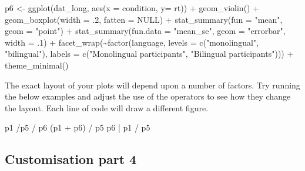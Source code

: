 \documentclass[
  english,
  doc,floatsintext]{apa6}
\newenvironment{Shaded}{\begin{snugshade}}{\end{snugshade}}
\newcommand{\AttributeTok}[1]{\textcolor[rgb]{0.77,0.63,0.00}{#1}}
\newcommand{\ConstantTok}[1]{\textcolor[rgb]{0.00,0.00,0.00}{#1}}
\newcommand{\DecValTok}[1]{\textcolor[rgb]{0.00,0.00,0.81}{#1}}
\newcommand{\FunctionTok}[1]{\textcolor[rgb]{0.00,0.00,0.00}{#1}}
\newcommand{\NormalTok}[1]{#1}
\newcommand{\OtherTok}[1]{\textcolor[rgb]{0.56,0.35,0.01}{#1}}
\newcommand{\SpecialCharTok}[1]{\textcolor[rgb]{0.00,0.00,0.00}{#1}}
\newcommand{\StringTok}[1]{\textcolor[rgb]{0.31,0.60,0.02}{#1}}
\begin{document}
\begin{Shaded}
\begin{Highlighting}[]
\NormalTok{p6 }\OtherTok{\textless{}{-}} \FunctionTok{ggplot}\NormalTok{(dat\_long, }\FunctionTok{aes}\NormalTok{(}\AttributeTok{x =}\NormalTok{ condition, }\AttributeTok{y=}\NormalTok{ rt)) }\SpecialCharTok{+}
  \FunctionTok{geom\_violin}\NormalTok{() }\SpecialCharTok{+}
  \FunctionTok{geom\_boxplot}\NormalTok{(}\AttributeTok{width =}\NormalTok{ .}\DecValTok{2}\NormalTok{, }\AttributeTok{fatten =} \ConstantTok{NULL}\NormalTok{) }\SpecialCharTok{+}
  \FunctionTok{stat\_summary}\NormalTok{(}\AttributeTok{fun =} \StringTok{"mean"}\NormalTok{, }\AttributeTok{geom =} \StringTok{"point"}\NormalTok{) }\SpecialCharTok{+}
  \FunctionTok{stat\_summary}\NormalTok{(}\AttributeTok{fun.data =} \StringTok{"mean\_se"}\NormalTok{, }\AttributeTok{geom =} \StringTok{"errorbar"}\NormalTok{, }\AttributeTok{width =}\NormalTok{ .}\DecValTok{1}\NormalTok{) }\SpecialCharTok{+}
  \FunctionTok{facet\_wrap}\NormalTok{(}\SpecialCharTok{\textasciitilde{}}\FunctionTok{factor}\NormalTok{(language, }
                     \AttributeTok{levels =} \FunctionTok{c}\NormalTok{(}\StringTok{"monolingual"}\NormalTok{, }\StringTok{"bilingual"}\NormalTok{),}
                     \AttributeTok{labels =} \FunctionTok{c}\NormalTok{(}\StringTok{"Monolingual participants"}\NormalTok{, }
                                \StringTok{"Bilingual participants"}\NormalTok{))) }\SpecialCharTok{+}
  \FunctionTok{theme\_minimal}\NormalTok{()}
\end{Highlighting}
\end{Shaded}

The exact layout of your plots will depend upon a number of factors. Try running the below examples and adjust the use of the operators to see how they change the layout. Each line of code will draw a different figure.

\begin{Shaded}
\begin{Highlighting}[]
\NormalTok{p1 }\SpecialCharTok{/}\NormalTok{p5 }\SpecialCharTok{/}\NormalTok{ p6 }
\NormalTok{(p1 }\SpecialCharTok{+}\NormalTok{ p6) }\SpecialCharTok{/}\NormalTok{ p5 }
\NormalTok{p6 }\SpecialCharTok{|}\NormalTok{ p1 }\SpecialCharTok{/}\NormalTok{ p5 }
\end{Highlighting}
\end{Shaded}

\hypertarget{customisation-part-4}{%
\subsection{Customisation part 4}\label{customisation-part-4}}
\end{document}
